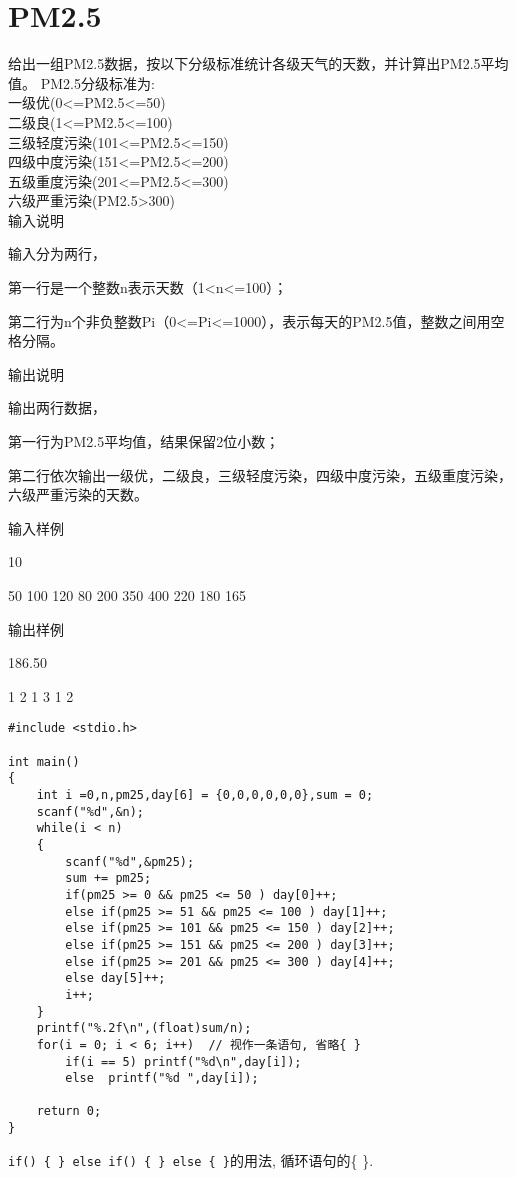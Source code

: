 \section{PM2.5}
给出一组PM2.5数据，按以下分级标准统计各级天气的天数，并计算出PM2.5平均值。
PM2.5分级标准为:\\
一级优(0<=PM2.5<=50)\\
二级良(1<=PM2.5<=100)\\
三级轻度污染(101<=PM2.5<=150)\\
四级中度污染(151<=PM2.5<=200)\\
五级重度污染(201<=PM2.5<=300)\\
六级严重污染(PM2.5>300)\\

输入说明
	
输入分为两行，

第一行是一个整数n表示天数（1<n<=100）；

第二行为n个非负整数Pi（0<=Pi<=1000），表示每天的PM2.5值，整数之间用空格分隔。

输出说明
	
输出两行数据，

第一行为PM2.5平均值，结果保留2位小数；

第二行依次输出一级优，二级良，三级轻度污染，四级中度污染，五级重度污染，六级严重污染的天数。

输入样例
	
10

50 100 120 80 200 350 400 220 180 165

输出样例	

186.50

1 2 1 3 1 2

\begin{lstlisting}
#include <stdio.h>

int main()
{
	int i =0,n,pm25,day[6] = {0,0,0,0,0,0},sum = 0;
	scanf("%d",&n);
	while(i < n) 
	{
		scanf("%d",&pm25);
		sum += pm25;
		if(pm25 >= 0 && pm25 <= 50 ) day[0]++;
		else if(pm25 >= 51 && pm25 <= 100 ) day[1]++;
		else if(pm25 >= 101 && pm25 <= 150 ) day[2]++;
		else if(pm25 >= 151 && pm25 <= 200 ) day[3]++;
		else if(pm25 >= 201 && pm25 <= 300 ) day[4]++;
		else day[5]++;
		i++;
	} 
	printf("%.2f\n",(float)sum/n);
	for(i = 0; i < 6; i++)  // 视作一条语句, 省略{ }
		if(i == 5) printf("%d\n",day[i]);
		else  printf("%d ",day[i]);
	
	return 0;
} 
\end{lstlisting}

\begin{note}[要点]
	\lstinline|if() { } else if() { } else { }|的用法, 循环语句的\{ \}.
\end{note}

